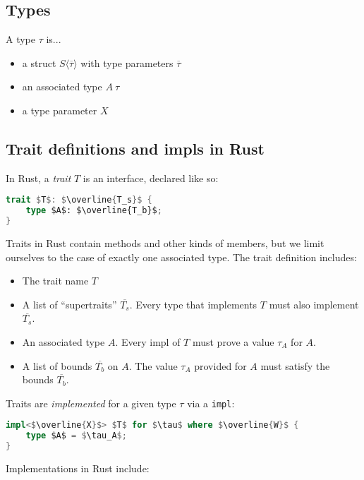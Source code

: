 \documentclass[sn-mathphys-num]{sn-jnl}%
\newcommand{\code}[1]{{\tt #1}}
\theoremstyle{thmstyleone}%
\theoremstyle{thmstyletwo}%
\theoremstyle{thmstylethree}%
\begin{document}
\subsection{Types}

A type $\tau$ is...

\begin{itemize}
    \item a struct $S\langle\overline{\tau}\rangle$ with type parameters $\overline{\tau}$
    \item an associated type $A\:\tau$
    \item a type parameter $X$
\end{itemize}

\subsection{Trait definitions and impls in Rust}

In Rust, a \emph{trait} $T$ is an interface, declared like so:

\begin{lstlisting}[language=Rust]
trait $T$: $\overline{T_s}$ {
    type $A$: $\overline{T_b}$;
}
\end{lstlisting}

Traits in Rust contain methods and other kinds of members, but we limit ourselves to the case of exactly one associated type.
The trait definition includes:

\begin{itemize}
    \item The trait name $T$
    \item A list of ``supertraits'' $\overline{T_s}$. Every type that implements $T$ must also implement $\overline{T_s}$.
    \item An associated type $A$. Every impl of $T$ must prove a value $\tau_A$ for $A$.
    \item A list of bounds $\overline{T_b}$ on $A$. The value $\tau_A$ provided for $A$ must satisfy the bounds $\overline{T_b}$.
\end{itemize}

Traits are \emph{implemented} for a given type $\tau$ via a \code{impl}:

\begin{lstlisting}[language=Rust, mathescape=true]
impl<$\overline{X}$> $T$ for $\tau$ where $\overline{W}$ {
    type $A$ = $\tau_A$;
}
\end{lstlisting}

Implementations in Rust include:
\end{document}
